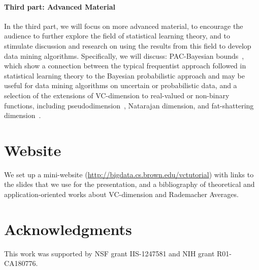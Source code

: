 \documentclass{sig-alternate-2013}
\begin{document}
\paragraph*{Third part: Advanced Material} In the third part, we will focus on more
advanced material, to encourage the audience to further explore the field of
statistical learning theory, and to stimulate discussion and research on using
the results from this field to develop data mining algorithms. Specifically, we
will discuss: PAC-Bayesian bounds~\citep{BoucheronBL05,ShalevSBD14}, which show
a connection between the typical frequentist approach followed in statistical
learning theory to the Bayesian probabilistic approach and may be useful for
data mining algorithms on uncertain or probabilistic data, and a selection of the
extensions of VC-dimension to real-valued or non-binary functions, including
pseudodimension~\citep{Pollard84}, Natarajan dimension, and fat-shattering
dimension~\citep{KearnsS90}.

\section{Website}\label{sec:website}
We set up a mini-website (\url{http://bigdata.cs.brown.edu/vctutorial}) with
links to the slides that we use for the presentation, and a bibliography of
theoretical and application-oriented works about VC-dimension and Rademacher
Averages.

\section{Acknowledgments}\label{sec:ack}
This work was supported by NSF grant IIS-1247581 and NIH grant R01-CA180776.
\end{document}
